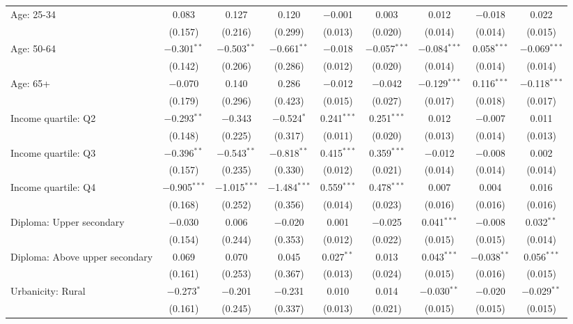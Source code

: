 \begin{tabular}{@{\extracolsep{5pt}}lcccccccc}
  Age: 25\mbox{-}34 & 0.083 & 0.127 & 0.120 & $-$0.001 & 0.003 & 0.012 & $-$0.018 & 0.022 \\ 
  & (0.157) & (0.216) & (0.299) & (0.013) & (0.020) & (0.014) & (0.014) & (0.015) \\ 
  Age: 50\mbox{-}64 & $-$0.301$^{**}$ & $-$0.503$^{**}$ & $-$0.661$^{**}$ & $-$0.018 & $-$0.057$^{***}$ & $-$0.084$^{***}$ & 0.058$^{***}$ & $-$0.069$^{***}$ \\ 
  & (0.142) & (0.206) & (0.286) & (0.012) & (0.020) & (0.014) & (0.014) & (0.014) \\ 
  Age: 65+ & $-$0.070 & 0.140 & 0.286 & $-$0.012 & $-$0.042 & $-$0.129$^{***}$ & 0.116$^{***}$ & $-$0.118$^{***}$ \\ 
  & (0.179) & (0.296) & (0.423) & (0.015) & (0.027) & (0.017) & (0.018) & (0.017) \\ 
  Income quartile: Q2 & $-$0.293$^{**}$ & $-$0.343 & $-$0.524$^{*}$ & 0.241$^{***}$ & 0.251$^{***}$ & 0.012 & $-$0.007 & 0.011 \\ 
  & (0.148) & (0.225) & (0.317) & (0.011) & (0.020) & (0.013) & (0.014) & (0.013) \\ 
  Income quartile: Q3 & $-$0.396$^{**}$ & $-$0.543$^{**}$ & $-$0.818$^{**}$ & 0.415$^{***}$ & 0.359$^{***}$ & $-$0.012 & $-$0.008 & 0.002 \\ 
  & (0.157) & (0.235) & (0.330) & (0.012) & (0.021) & (0.014) & (0.014) & (0.014) \\ 
  Income quartile: Q4 & $-$0.905$^{***}$ & $-$1.015$^{***}$ & $-$1.484$^{***}$ & 0.559$^{***}$ & 0.478$^{***}$ & 0.007 & 0.004 & 0.016 \\ 
  & (0.168) & (0.252) & (0.356) & (0.014) & (0.023) & (0.016) & (0.016) & (0.016) \\ 
  Diploma: Upper secondary & $-$0.030 & 0.006 & $-$0.020 & 0.001 & $-$0.025 & 0.041$^{***}$ & $-$0.008 & 0.032$^{**}$ \\ 
  & (0.154) & (0.244) & (0.353) & (0.012) & (0.022) & (0.015) & (0.015) & (0.014) \\ 
  Diploma: Above upper secondary & 0.069 & 0.070 & 0.045 & 0.027$^{**}$ & 0.013 & 0.043$^{***}$ & $-$0.038$^{**}$ & 0.056$^{***}$ \\ 
  & (0.161) & (0.253) & (0.367) & (0.013) & (0.024) & (0.015) & (0.016) & (0.015) \\ 
  Urbanicity: Rural & $-$0.273$^{*}$ & $-$0.201 & $-$0.231 & 0.010 & 0.014 & $-$0.030$^{**}$ & $-$0.020 & $-$0.029$^{**}$ \\ 
  & (0.161) & (0.245) & (0.337) & (0.013) & (0.021) & (0.015) & (0.015) & (0.015) \\ 

\end{tabular}

